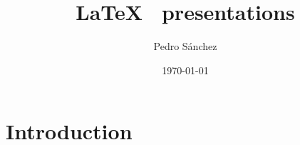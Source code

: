 \documentclass{beamer}
\title{\LaTeX ~ presentations}
\author[Sánchez]{Pedro Sánchez}
\date{\today}
\begin{document}
\begin{frame}
    \titlepage
\end{frame}


\begin{frame}
    \tableofcontents[hideallsubsections]
\end{frame}


\section{Introduction}
\end{document}
